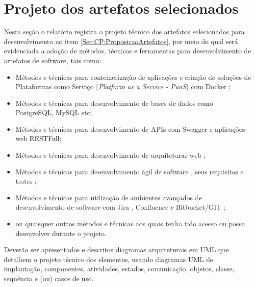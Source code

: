 \documentclass[12pt]{article}
\newcommand{\rascbegin}{\color{red}}    %
\begin{document}
	\section{Projeto dos artefatos selecionados\label{Sec:CP:ProjetoArtefato}}
    \rascbegin	
	Nesta seção o relatório registra o projeto técnico dos artefatos selecionados para desenvolvimento no item \ref{Sec:CP:ProposicaoArtefatos}, 
	por meio do qual será evidenciada a adoção de métodos, técnicas e ferramentas para desenvolvimento de artefatos de software, tais como:
	\begin{itemize}
		\item Métodos e técnicas para conteinerização de aplicações e criação de soluções de Plataformas como Serviço (\textit{Platform as a Service - PaaS}) com Docker \citep{matthias_docker:_2015,mouat_using_2016};
		
		\item Métodos e técnicas para desenvolvimento de bases de dados como PostgreSQL, MySQL etc;
		
		\item Métodos e técnicas para desenvolvimento de APIs com Swagger \citep{swagger_swagger_2018} e aplicações web RESTFull\citep{mehta_restful_2014};
		
		\item Métodos e técnicas para desenvolvimento de arquiteturas web \citep{adams_mastering_2015,firtman_high_2015};
		
		\item Métodos e técnicas para desenvolvimento ágil de software \citep{garbajosa_agile_2018,lacey_scrum_2012}, seus requisitos \citep{davis_software_1990} e testes \citep{rose_cucumber_2015,smart_bdd_2014};
		
		\item Métodos e técnicas para utilização de ambientes avançados de desenvolvimento de software com Jira \citep{li_jira_2015}, Confluence \citep{kohler_atlassian_2013} e Bitbucket/GIT  \citep{westby_git_2015};
		
		\item ou quaisquer outros métodos e técnicas aos quais tenha tido acesso ou possa desenvolver durante o projeto.
	\end{itemize} 
	
	Deverão ser apresentados e descritos diagramas arquiteturais em UML que detalhem o projeto técnico dos elementos, usando diagramas UML de implantação, componentes, atividades, estados, comunicação, objetos, classe, sequência e (ou) casos de uso.
	
\end{document}
